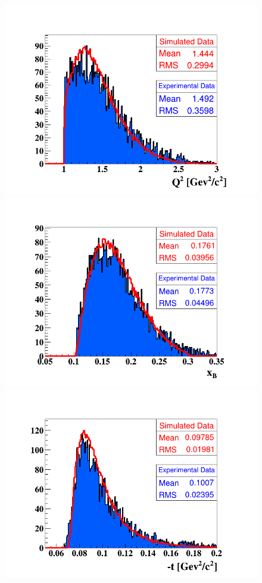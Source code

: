 \begin{figure}[h!]
\includegraphics[scale=0.31]{fig_dvcs/comp/Q2_Coh.png}
\includegraphics[scale=0.31]{fig_dvcs/comp/xB_Coh.png}
\includegraphics[scale=0.31]{fig_dvcs/comp/t_Coh.png}

\end{figure}
